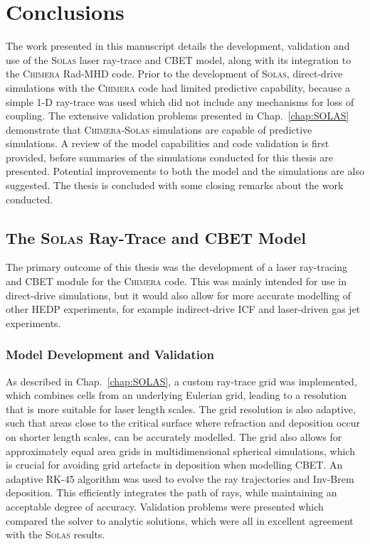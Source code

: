 \chapter{Conclusions}%
\label{chap:conclusions}

The work presented in this manuscript details the development, validation and use of the \textsc{Solas} laser ray-trace and \ac{CBET} model, along with its integration to the \textsc{Chimera} \ac{Rad-MHD} code.
Prior to the development of \textsc{Solas}, direct-drive simulations with the \textsc{Chimera} code had limited predictive capability, because a simple 1-D ray-trace was used which did not include any mechanisms for loss of coupling.
The extensive validation problems presented in Chap.~\ref{chap:SOLAS} demonstrate that \textsc{Chimera}-\textsc{Solas} simulations are capable of predictive simulations.
A review of the model capabilities and code validation is first provided, before summaries of the simulations conducted for this thesis are presented.
Potential improvements to both the model and the simulations are also suggested.
The thesis is concluded with some closing remarks about the work conducted.

\newpage

\section{The \textsc{Solas} Ray-Trace and CBET Model}

The primary outcome of this thesis was the development of a laser ray-tracing and \ac{CBET} module for the \textsc{Chimera} code.
This was mainly intended for use in direct-drive simulations, but it would also allow for more accurate modelling of other \ac{HEDP} experiments, for example indirect-drive \ac{ICF} and laser-driven gas jet experiments.

\subsection{Model Development and Validation}

As described in Chap.~\ref{chap:SOLAS}, a custom ray-trace grid was implemented, which combines cells from an underlying Eulerian grid, leading to a resolution that is more suitable for laser length scales.
The grid resolution is also adaptive, such that areas close to the critical surface where refraction and deposition occur on shorter length scales, can be accurately modelled.
The grid also allows for approximately equal area grids in multidimensional spherical simulations, which is crucial for avoiding grid artefacts in deposition when modelling \ac{CBET}.
An adaptive RK-45 algorithm was used to evolve the ray trajectories and \ac{Inv-Brem} deposition.
This efficiently integrates the path of rays, while maintaining an acceptable degree of accuracy.
Validation problems were presented which compared the solver to analytic solutions, which were all in excellent agreement with the \textsc{Solas} results.

